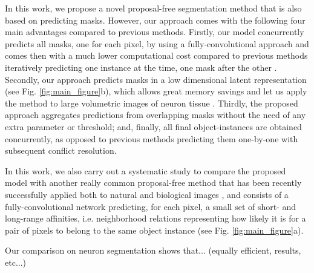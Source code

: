 In this work, we propose a novel proposal-free segmentation method that is also based on predicting \maskname masks. However, our approach comes with the following four main advantages compared to previous methods.
Firstly, our model concurrently predicts all \maskname masks, one for each pixel, by using a fully-convolutional approach and comes then with a much lower computational cost compared to previous methods iteratively predicting one instance at the time, one mask after the other \cite{januszewski2018high,meirovitch2016multi}.
Secondly, our approach predicts \maskname masks in a low dimensional latent representation (see Fig. \ref{fig:main_figure}b), which allows great memory savings and let us apply the method to large volumetric images of neuron tissue \cite{arganda2015crowdsourcing}. 
Thirdly, the proposed approach aggregates predictions from overlapping \maskname masks without the need of any extra parameter or threshold;
and, finally, all final object-instances are obtained concurrently, as opposed to previous methods predicting them one-by-one with subsequent conflict resolution. 


In this work, we also carry out a systematic study to compare the proposed model with another really common proposal-free method that has been recently successfully applied both to natural and biological images \cite{liu2018affinity,Gao_2019_ICCV,lee2017superhuman,wolf2018mutex,bailoni2019generalized}, and consists of a fully-convolutional network predicting, for each pixel, a small set of short- and long-range affinities, i.e. neighborhood relations representing how likely it is for a pair of pixels to belong to the same object instance (see Fig. \ref{fig:main_figure}a). 

\TODO{} Our comparison on neuron segmentation shows that... (equally efficient, results, etc...)



